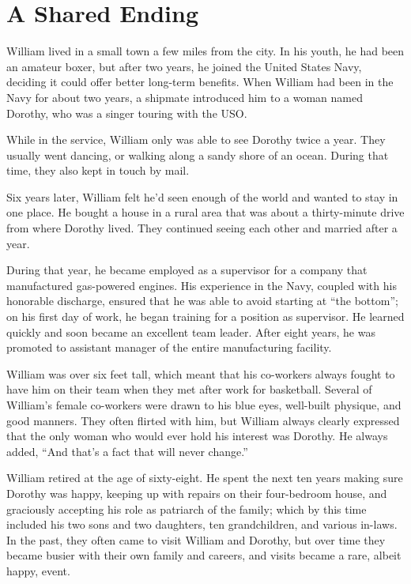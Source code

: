 \chapter{A Shared Ending}

William lived in a small town a few miles from the city. In his youth, he had been an amateur boxer, but after two years, he joined the United States Navy, deciding it could offer better long-term benefits. When William had been in the Navy for about two years, a shipmate introduced him to a woman named Dorothy, who was a singer touring with the USO.

While in the service, William only was able to see Dorothy twice a year. They usually went dancing, or walking along a sandy shore of an ocean. During that time, they also kept in touch by mail.

Six years later, William felt he'd seen enough of the world and wanted to stay in one place. He bought a house in a rural area that was about a thirty-minute drive from where Dorothy lived. They continued seeing each other and married after a year.

During that year, he became employed as a supervisor for a company that manufactured gas-powered engines. His experience in the Navy, coupled with his honorable discharge, ensured that he was able to avoid starting at “the bottom”; on his first day of work, he began training for a position as supervisor. He learned quickly and soon became an excellent team leader. After eight years, he was promoted to assistant manager of the entire manufacturing facility.

William was over six feet tall, which meant that his co-workers always fought to have him on their team when they met after work for basketball. Several of William's female co-workers were drawn to his blue eyes, well-built physique, and good manners. They often flirted with him, but William always clearly expressed that the only woman who would ever hold his interest was Dorothy. He always added, “And that's a fact that will never change.”

William retired at the age of sixty-eight. He spent the next ten years making sure Dorothy was happy, keeping up with repairs on their four-bedroom house, and graciously accepting his role as patriarch of the family; which by this time included his two sons and two daughters, ten grandchildren, and various in-laws. In the past, they often came to visit William and Dorothy, but over time they became busier with their own family and careers, and visits became a rare, albeit happy, event.

